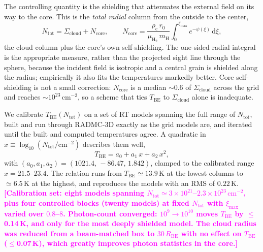 \documentclass[11pt,a4paper]{article}
\newcommand{\note}[1]{\textcolor{magenta}{\textbf{[#1]}}}
\newcommand{\rhoc}{\rho_{\mathrm{c}}}
\newcommand{\rzero}{r_{0}}
\newcommand{\Rbe}{R_{\mathrm{BE}}}
\newcommand{\Tbe}{T_{\mathrm{BE}}}
\newcommand{\ximax}{\xi_{\mathrm{max}}}
\newcommand{\Scloud}{\Sigma_{\mathrm{cloud}}}
\newcommand{\mH}{m_{\mathrm{H}}}
\begin{document}
The controlling quantity is the shielding that attenuates the external field on
its way to the core. This is the \emph{total radial} column from the outside to
the center,
\begin{equation}
  N_{\mathrm{tot}} = \Scloud + N_{\mathrm{core}},
  \qquad
  N_{\mathrm{core}} = \frac{\rhoc\,\rzero}{\mu_{\mathrm{H_2}}\,\mH}
                      \int_{0}^{\ximax} e^{-\psi(\xi)}\,\mathrm{d}\xi ,
  \label{eq:Ntot}
\end{equation}
the cloud column plus the core's own self-shielding. The one-sided radial integral
is the appropriate measure, rather than the projected sight line through the
sphere, because the incident field is isotropic and a central grain is shielded
along the radius; empirically it also fits the temperatures markedly better. Core
self-shielding is not a small correction: $N_{\mathrm{core}}$ is a median
$\sim$0.6 of $\Scloud$ across the grid and reaches
$\sim$$10^{23}\,\mathrm{cm^{-2}}$, so a scheme that ties $\Tbe$ to $\Scloud$ alone
is inadequate.

We calibrate $\Tbe(N_{\mathrm{tot}})$ on a set of RT models spanning the full
range of $N_{\mathrm{tot}}$, built and run through RADMC-3D exactly as the grid
models are, and iterated until the built and computed temperatures agree. A
quadratic in $x \equiv \log_{10}(N_{\mathrm{tot}}/\mathrm{cm^{-2}})$ describes them
well,
\begin{equation}
  \Tbe = a_{0} + a_{1}\,x + a_{2}\,x^{2},
  \label{eq:TofN}
\end{equation}
with $(a_{0},a_{1},a_{2}) = (1021.4,\,-86.47,\,1.842)$, clamped to the calibrated
range $x = 21.5$--$23.4$. The relation runs from $\Tbe \simeq 13.9$\,K at the
lowest columns to $\simeq 6.5$\,K at the highest, and reproduces the models with an
RMS of $0.22$\,K.
\note{Calibration set: eight models spanning
$N_{\mathrm{tot}}\simeq3\times10^{21}$--$2.3\times10^{23}\,\mathrm{cm^{-2}}$, plus
four controlled blocks (twenty models) at fixed $N_{\mathrm{tot}}$ with $\ximax$
varied over $0.8$--$8$. Photon-count converged: $10^{9}\to10^{10}$ moves $\Tbe$ by
$\le$0.14\,K, and only for the most deeply shielded model. The cloud radius was
reduced from a beam-matched box to $30\,\Rbe$ with no effect on $\Tbe$
($\le$0.07\,K), which greatly improves photon statistics in the core.}
\end{document}
